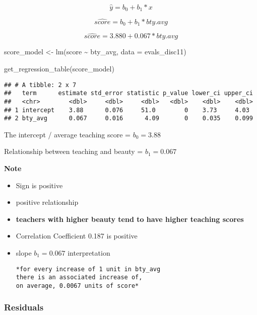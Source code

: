 \documentclass[
]{article}
\newenvironment{Shaded}{\begin{snugshade}}{\end{snugshade}}
\newcommand{\AttributeTok}[1]{\textcolor[rgb]{0.77,0.63,0.00}{#1}}
\newcommand{\FunctionTok}[1]{\textcolor[rgb]{0.00,0.00,0.00}{#1}}
\newcommand{\NormalTok}[1]{#1}
\newcommand{\OtherTok}[1]{\textcolor[rgb]{0.56,0.35,0.01}{#1}}
\newcommand{\SpecialCharTok}[1]{\textcolor[rgb]{0.00,0.00,0.00}{#1}}
\begin{document}
\[\hat{y} = b_0 + b_1 * x\]

\[\hat{score} = b_0 + b_1 * bty.avg\]

\[\hat{score} = 3.880 + 0.067 * bty.avg\]

\begin{Shaded}
\begin{Highlighting}[]
\NormalTok{score\_model }\OtherTok{\textless{}{-}} \FunctionTok{lm}\NormalTok{(score }\SpecialCharTok{\textasciitilde{}}\NormalTok{ bty\_avg, }\AttributeTok{data =}\NormalTok{ evals\_disc11)}

\FunctionTok{get\_regression\_table}\NormalTok{(score\_model)}
\end{Highlighting}
\end{Shaded}

\begin{verbatim}
## # A tibble: 2 x 7
##   term      estimate std_error statistic p_value lower_ci upper_ci
##   <chr>        <dbl>     <dbl>     <dbl>   <dbl>    <dbl>    <dbl>
## 1 intercept    3.88      0.076     51.0        0    3.73     4.03 
## 2 bty_avg      0.067     0.016      4.09       0    0.035    0.099
\end{verbatim}

The intercept / average teaching score = \(b_0 = 3.88\)

Relationship between teaching and beauty = \(b_1 = 0.067\)

\textbf{Note}

\begin{itemize}
\item
  Sign is positive
\item
  positive relationship
\item
  \textbf{teachers with higher beauty tend to have higher teaching
  scores}
\item
  Correlation Coefficient 0.187 is positive
\item
  slope \(b_1 = 0.067\) interpretation

\begin{verbatim}
*for every increase of 1 unit in bty_avg
there is an associated increase of,
on average, 0.0067 units of score*
\end{verbatim}
\end{itemize}

\hypertarget{residuals}{%
\subsubsection{Residuals}\label{residuals}}
\end{document}
